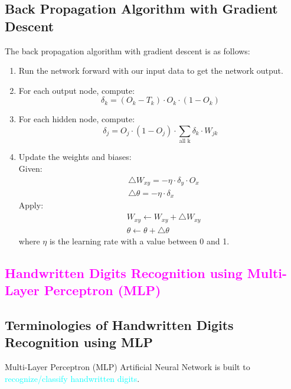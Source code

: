 \documentclass{book}
\begin{document}
\subsection{Back Propagation Algorithm with Gradient Descent}
The back propagation algorithm with gradient descent is as follows:
\begin{enumerate}
    \item Run the network forward with our input data to get the network output.
    \item For each output node, compute:
    \[
        \delta_k = (O_k - T_k) \cdot O_k \cdot (1 - O_k)
    \]
    \item For each hidden node, compute:
    \[
        \delta_j = O_j \cdot (1 - O_j) \cdot \sum_{\text{all k}} \delta_k \cdot W_{jk}
    \]
    \item Update the weights and biases:\\
    Given: 
    \begin{align*}
        & \triangle W_{xy} = -\eta \cdot \delta_y \cdot O_x\\
        & \triangle \theta = -\eta \cdot \delta_x
    \end{align*}
    Apply:
    \begin{align*}
        & W_{xy} \leftarrow W_{xy} + \triangle W_{xy}\\
        & \theta \leftarrow \theta + \triangle \theta
    \end{align*}
    where \(\eta\) is the learning rate with a value between 0 and 1.
\end{enumerate}
\textcolor{magenta}{\section{\textbf{Handwritten Digits Recognition using Multi-Layer Perceptron (MLP)}}}

\subsection{Terminologies of Handwritten Digits Recognition using MLP}
Multi-Layer Perceptron (MLP) Artificial Neural Network is built to \textcolor{cyan}{recognize/classify handwritten digits}.\\
\end{document}
